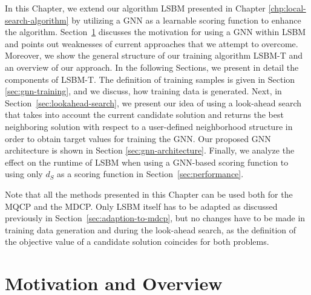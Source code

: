 \documentclass[draft,final]{vutinfth} %
\begin{document}
In this Chapter, we extend our algorithm LSBM presented in Chapter \ref{chp:local-search-algorithm} by utilizing a GNN as a learnable scoring function to enhance the algorithm. 
Section~\ref{sec:gnn-local-search} discusses the motivation for using a GNN within LSBM and points out weaknesses of current approaches that we attempt to overcome. Moreover, we show the general structure of our training algorithm LSBM-T and an overview of our approach. 
In the following Sections, we present in detail the components of LSBM-T. The definition of training samples is given in Section \ref{sec:gnn-training}, and we discuss, how training data is generated. 
Next, in Section~\ref{sec:lookahead-search}, we present our idea of using a look-ahead search that takes into account the current candidate solution and returns the best neighboring solution with respect to a user-defined neighborhood structure in order to obtain target values for training the GNN. 
Our proposed GNN architecture is shown in Section \ref{sec:gnn-architecture}. 
Finally, we analyze the effect on the runtime of LSBM when using a GNN-based scoring function to using only $d_S$ as a scoring function in Section~\ref{sec:performance}. 

Note that all the methods presented in this Chapter can be used both for the MQCP and the MDCP. Only LSBM itself has to be adapted as discussed previously in Section~\ref{sec:adaption-to-mdcp}, but no changes have to be made in training data generation and during the look-ahead search, as the definition of the objective value of a candidate solution coincides for both problems. 

\section{Motivation and Overview}\label{sec:gnn-local-search}
\end{document}
